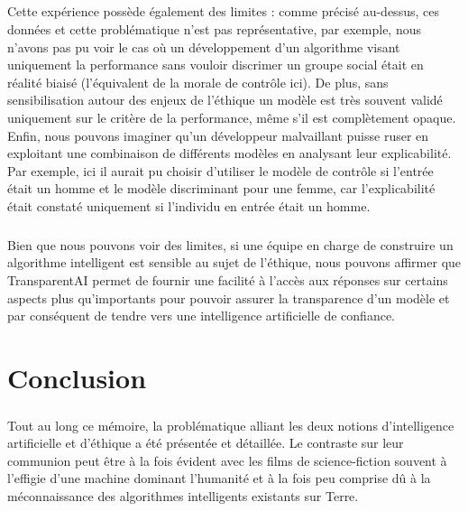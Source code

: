 \documentclass[10pt, french, a4paper]{report}
\begin{document}
\paragraph{}
Cette expérience possède également des limites : comme précisé au-dessus, ces données et cette problématique n'est pas représentative, par exemple, nous n'avons pas pu voir le cas où un développement d'un algorithme visant uniquement la performance sans vouloir discrimer un groupe social était en réalité biaisé (l'équivalent de la morale de contrôle ici). De plus, sans sensibilisation autour des enjeux de l'éthique un modèle est très souvent validé uniquement sur le critère de la performance, même s'il est complètement opaque. Enfin, nous pouvons imaginer qu'un développeur malvaillant puisse ruser en exploitant une combinaison de différents modèles en analysant leur explicabilité. Par exemple, ici il aurait pu choisir d'utiliser le modèle de contrôle si l'entrée était un homme et le modèle discriminant pour une femme, car l'explicabilité était constaté uniquement si l'individu en entrée était un homme. 

\paragraph{}
Bien que nous pouvons voir des limites, si une équipe en charge de construire un algorithme intelligent est sensible au sujet de l'éthique, nous pouvons affirmer que TransparentAI permet de fournir une facilité à l'accès aux réponses sur certains aspects plus qu'importants pour pouvoir assurer la transparence d'un modèle et par conséquent de tendre vers une intelligence artificielle de confiance.


\newpage
\chapter*{Conclusion}

\paragraph{}
Tout au long ce mémoire, la problématique alliant les deux notions d’intelligence artificielle et d’éthique a été présentée et détaillée. Le contraste sur leur communion peut être à la fois évident avec les films de science-fiction souvent à l’effigie d’une machine dominant l’humanité et à la fois peu comprise dû à la méconnaissance des algorithmes intelligents existants sur Terre.
\end{document}

